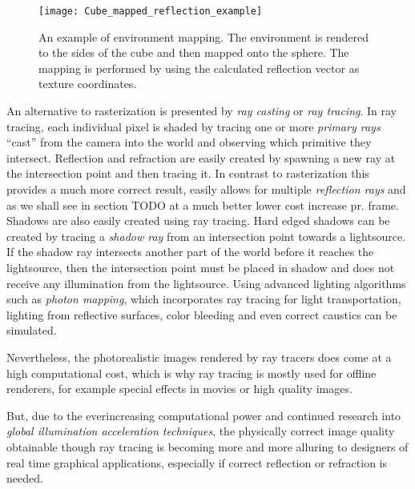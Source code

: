\begin{figure}
  \centering
  \texttt{[image: Cube\_mapped\_reflection\_example]}
  \caption{An example of environment mapping. The environment is
    rendered to the sides of the cube and then mapped onto the sphere.
    The mapping is performed by using the calculated reflection vector
    as texture coordinates.}
  \label{fig:cubemap}
\end{figure}

An alternative to rasterization is presented by \textit{ray casting}
or \textit{ray tracing}. In ray tracing, each individual pixel is
shaded by tracing one or more \textit{primary rays} ``cast'' from the
camera into the world and observing which primitive they
intersect. Reflection and refraction are easily created by spawning a
new ray at the intersection point and then tracing it. In contrast to
rasterization this provides a much more correct result, easily allows
for multiple \textit{reflection rays} and as we shall see in section
TODO at a much better lower cost increase pr. frame. Shadows are also
easily created using ray tracing. Hard edged shadows can be created by
tracing a \textit{shadow ray} from an intersection point towards a
lightsource. If the shadow ray intersects another part of the world
before it reaches the lightsource, then the intersection point must be
placed in shadow and does not receive any illumination from the
lightsource. Using advanced lighting algorithms such as \textit{photon
  mapping}, which incorporates ray tracing for light transportation,
lighting from reflective surfaces, color bleeding and even correct
caustics can be simulated.


Nevertheless, the photorealistic images rendered by ray tracers does
come at a high computational cost, which is why ray tracing is mostly
used for offline renderers, for example special effects in movies or
high quality images.



But, due to the everincreasing computational power and continued
research into \textit{global illumination acceleration techniques},
the physically correct image quality obtainable though ray tracing is
becoming more and more alluring to designers of real time graphical
applications, especially if correct reflection or refraction is
needed.


